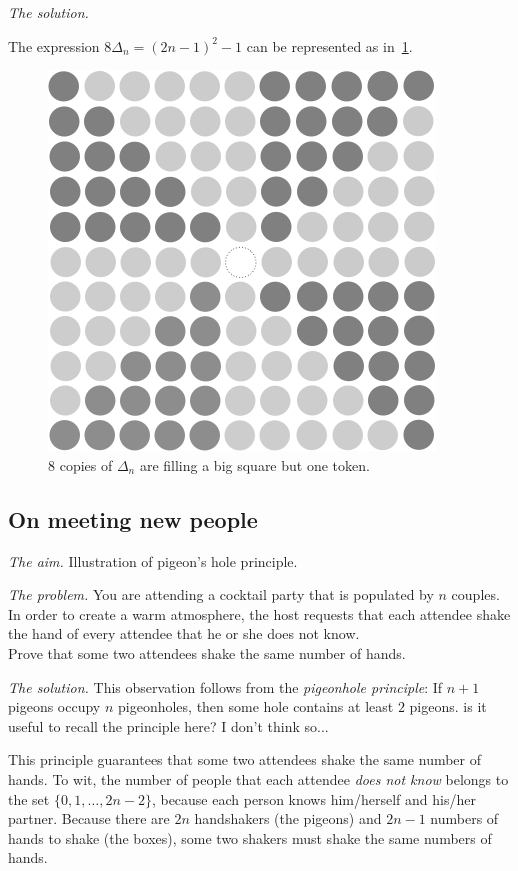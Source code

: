 \noindent \textit{The solution.}

The expression $8 \Delta_n = (2n-1)^2 -1$ can be represented as in~\ref{fig:Sum8deltas}.
\begin{figure}[ht]
\begin{center}
       \includegraphics[scale=0.4]{FiguresMaths/Delta8}
\caption{8 copies of $\Delta_n$ are filling a big square but one token.}
       \label{fig:Sum8deltas}
\end{center}
\end{figure}


\subsection{On meeting new people}

\noindent \textit{The aim.}
Illustration of pigeon's hole principle.
\medskip

\noindent \textit{The problem.}
You are attending a cocktail party that is populated by $n$ couples.
In order to create a warm atmosphere, the host requests that each
attendee shake the hand of every attendee that he or she does not
know. \\
Prove that some two attendees shake the same number of hands.
\medskip

\noindent \textit{The solution.}
%
This observation follows from the \textit{pigeonhole principle}:
If $n+1$ pigeons occupy $n$ pigeonholes, then some hole contains
at least $2$ pigeons.
{\Denis is it useful to recall the principle here? I don't think so...}

This principle guarantees that some two attendees shake the same
number of hands.  To wit, the number of people that each attendee {\em
  does not know} belongs to the set $\{ 0, 1, \ldots, 2n-2 \}$,
because each person knows him/herself and his/her partner.  Because
there are $2n$ handshakers (the pigeons) and $2n-1$ numbers of hands
to shake (the boxes), some two shakers must shake the same numbers of
hands. 
\medskip

